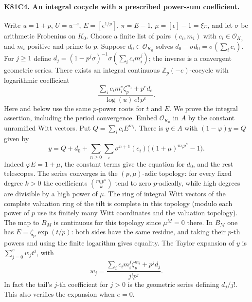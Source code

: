 \paragraph{K81C4. An integral cocycle with a prescribed power-sum coefficient.}
Write $u=1+p$, $U=u^{-e}$, $E=[\epsilon^{1/p}]$, $\pi=E-1$,
$\mu=[\epsilon]-1=\xi\pi$, and let $\sigma$ be arithmetic
Frobenius on $K_0$. Choose a finite list of pairs $(c_i,m_i)$ with
$c_i\in\mathcal O_{K_0}$ and $m_i$ positive and prime to $p$.
Suppose $d_0\in\mathcal O_{K_0}$ solves
$d_0-\sigma d_0=\sigma(\sum_i c_i)$. For $j\ge1$ define
$d_j=(1-p^j\sigma)^{-1}\sigma(\sum_i c_i m_i^j)$;
the inverse is a convergent geometric series. There exists an
integral continuous $\mathbb Z_p(-e)$-cocycle with logarithmic
coefficient
\[
     \frac{\sum_i c_i m_i^e\zeta_p^{m_i}+p^e d_e}
                       {\log(u)\,e!\,p^e} .
\]
Here and below use the same $p$-power roots for $t$ and $E$.
We prove the integral assertion, including the period convergence.
Embed $\mathcal O_{K_0}$ in $A$ by the constant unramified Witt
vectors. Put $Q=\sum_i c_i E^{m_i}$. There is $y\in A$ with
$(1-\varphi)y=Q$ given by
\[
 y=Q+d_0+
     \sum_{n\ge0}\sum_i\sigma^{n+1}(c_i)
                         \bigl((1+\mu)^{m_i p^n}-1\bigr).
\]
Indeed $\varphi E=1+\mu$, the constant terms give the equation
for $d_0$, and the rest telescopes. The series converges in the
$(p,\mu)$-adic topology: for every fixed degree $k>0$ the
coefficients $\binom{m_i p^n}{k}$ tend to zero $p$-adically,
while high degrees are divisible by a high power of $\mu$.
The ring of integral Witt vectors of the complete valuation ring
of the tilt is complete in this topology (modulo each power of
$p$ use its finitely many Witt coordinates and the valuation
topology). The map to $B_M$ is continuous for this topology since
$\mu^M=0$ there. In $B_M$ one has $E=\zeta_p\exp(t/p)$:
both sides have the same residue, and taking their $p$-th powers
and using the finite logarithm gives equality. The Taylor expansion
of $y$ is $\sum_{j=0}^e w_jt^j$, with
\[
 w_j=\frac{\sum_i c_i m_i^j\zeta_p^{m_i}+p^j d_j}{j!p^j}.
\]
In fact the tail's $j$-th coefficient for $j>0$ is the geometric
series defining $d_j/j!$. This also verifies the expansion when
$e=0$.

